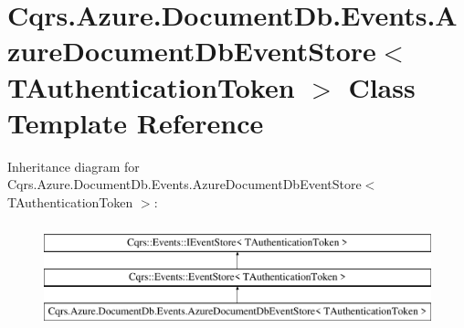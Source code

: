 \hypertarget{classCqrs_1_1Azure_1_1DocumentDb_1_1Events_1_1AzureDocumentDbEventStore}{}\section{Cqrs.\+Azure.\+Document\+Db.\+Events.\+Azure\+Document\+Db\+Event\+Store$<$ T\+Authentication\+Token $>$ Class Template Reference}
\label{classCqrs_1_1Azure_1_1DocumentDb_1_1Events_1_1AzureDocumentDbEventStore}
Inheritance diagram for Cqrs.\+Azure.\+Document\+Db.\+Events.\+Azure\+Document\+Db\+Event\+Store$<$ T\+Authentication\+Token $>$\+:\begin{figure}[H]
\begin{center}
\leavevmode
\includegraphics[height=3.000000cm]{classCqrs_1_1Azure_1_1DocumentDb_1_1Events_1_1AzureDocumentDbEventStore}
\end{center}
\end{figure}
